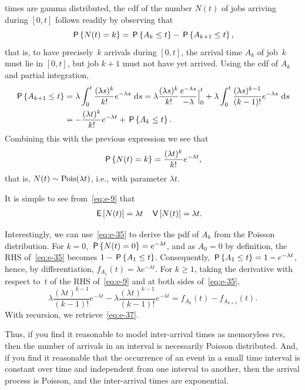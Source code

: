 \documentclass[queueing-book.tex]{subfiles}
\begin{document}
 times are gamma distributed,  the cdf of the number $N(t)$ of jobs arriving during $[0, t]$ follows readily by observing that
\begin{equation}\label{eq:e-35}
\P{N(t) = k} = \P{A_k \leq t} - \P{A_{k+1} \leq t},
\end{equation}
that is, to have precisely~$k$ arrivals during $[0, t]$, the arrival time $A_{k}$ of job~$k$ must lie in $[0, t]$, but job $k+1$ must not have yet arrived.
Using the cdf of $A_{k}$ and partial integration,
\begin{align*}
\P{A_{k+1} \leq t}
&= \lambda \int_0^t \frac{(\lambda s)^{k}}{k!}e^{-\lambda s}\, \d s
= \lambda \frac{(\lambda s)^{k}}{k!}\frac{e^{-\lambda s}}{-\lambda} \Big|_{0}^t + \lambda \int_0^t \frac{(\lambda s)^{k-1}}{(k-1)!}e^{-\lambda s}\, \d s \\
&= - \frac{(\lambda t)^{k}}{k!} e^{-\lambda t} + \P{A_k \leq t}.
\end{align*}
Combining this with the previous  expression we see that
\begin{equation}\label{eq:e-9}
\P{N(t) = k} = \frac{(\lambda t)^{k}}{k!} e^{-\lambda t},
\end{equation}
that is, $N(t) \sim \Pois{\lambda t}$, i.e.,  with parameter $\lambda t$.



It is simple to see from~\cref{eq:e-9} that
\begin{align*}
\E{N(t)} &= \lambda t
& \V{N(t)} &= \lambda t.
\end{align*}



Interestingly, we can use~\cref{eq:e-35} to derive the pdf of $A_{k}$ from the Poisson distribution.
For $k=0$, $\P{N(t) = 0} = e^{-\lambda t}$, and as $A_0=0$ by definition, the RHS of~\cref{eq:e-35} becomes $1-\P{A_1\leq t}$.
Consequently, $\P{A_{1}\leq t} = 1 - e^{-\lambda t}$, hence, by differentiation,  $f_{A_1}(t) = \lambda e^{-\lambda t}$.
For $k\geq 1$, taking the derivative with respect to~$t$ of the RHS of~\cref{eq:e-9} and at both sides of~\cref{eq:e-35},
\begin{equation*}
\lambda \frac{(\lambda t)^{k-1}}{(k-1)!} e^{-\lambda t} - \lambda \frac{(\lambda t)^{k-1}}{(k-1)!} e^{-\lambda t} = f_{A_{k}}(t) - f_{A_{k+1}}(t).
\end{equation*}
With recursion, we retrieve~\cref{eq:e-37}.


Thus, if you find it reasonable to model inter-arrival times as memoryless rvs, then the number of arrivals in an interval is necessarily Poisson distributed.
And, if you find it reasonable that the occurrence of an event in a small time interval is constant over time and independent from one interval to another, then the arrival process is Poisson, and the inter-arrival times are exponential.
\end{document}
